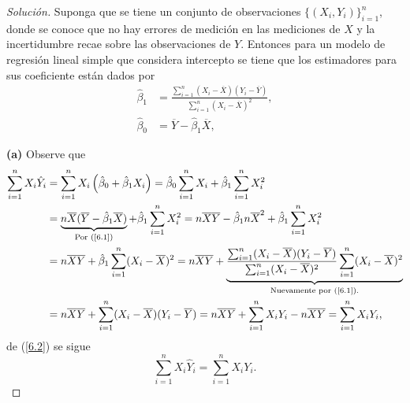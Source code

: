 \documentclass[10.5pt,notitlepage]{article}
\newenvironment{solucion}
  {\begin{proof}[Solución]}
  {\end{proof}}
\newcommand{\pare}[1]{\left( #1 \right)}
\begin{document}
\begin{solucion}
Suponga que se tiene un conjunto de observaciones \(\{(X_i,Y_i)\}_{i=1}^{n}\), donde se conoce que no hay errores de medición en las mediciones de \(X\) y la incertidumbre recae sobre las observaciones de \(Y\). Entonces para un modelo de regresión lineal simple que considera intercepto se tiene que los estimadores para sus coeficiente están dados por 
\begin{align}\label{6.1}
    \hat{\beta}_1 &= \frac{\sum_{i = 1}^{n}(X_i - \overline{X})(Y_i - \overline{Y})}{\sum_{i=1}^{n}(X_i - \overline{X})^2},\nonumber\\ 
    \hat{\beta}_0 &= \overline{Y} - \hat{\beta}_1 \overline{X}, 
\end{align}

\noindent \textbf{(a)} Observe que 
\begin{align}
    \sum_{i = 1}^{n}X_i \hat{Y}_i &=\sum_{i=1}^{n}X_i\pare{\hat{\beta}_0 + \hat{\beta}_1X_i}=\hat{\beta}_0\sum_{i = 1}^{n}X_i + \hat{\beta}_1 \sum_{i=1}^{n}X_{i}^2\nonumber\\ 
                            &= \underbrace{n\overline{X}(\overline{Y} - \hat{\beta}_1 \overline{X})}_{\text{Por (\ref{6.1})}} + \hat{\beta}_1 \sum_{i = 1}^{n} X_{i}^2= n \overline{X}\overline{Y} - \hat{\beta}_{1} n\overline{X}^2 + \hat{\beta}_1\sum_{i =1}^{n}X_{i}^2\nonumber\\
                            &= n\overline{X}\overline{Y} + \hat{\beta}_1\sum_{i =1}^{n}(X_i -\overline{X})^2=  n\overline{X}\overline{Y}  + \underbrace{\frac{\sum_{i = 1}^{n}(X_i - \overline{X})(Y_i - \overline{Y})}{\sum_{i=1}^{n}(X_i - \overline{X})^2}\sum_{i =1}^{n}(X_i -\overline{X})^2}_{\text{\shortstack{Nuevamente por (\ref{6.1}).}}}\nonumber\\
                            &= n\overline{X}\overline{Y} + \sum_{i = 1}^{n}(X_i - \overline{X})(Y_i - \overline{Y}) =  n\overline{X}\overline{Y} + \sum_{i = 1}^{n}X_iY_i -  n\overline{X}\overline{Y} = \sum_{i = 1}^{n}X_iY_i,\label{6.2}
\end{align}
de (\ref{6.2}) se sigue 
\[
\sum_{i = 1}^{n}X_i \hat{Y}_i = \sum_{i = 1}^{n}X_iY_i.
\]


\end{solucion}
\end{document}
